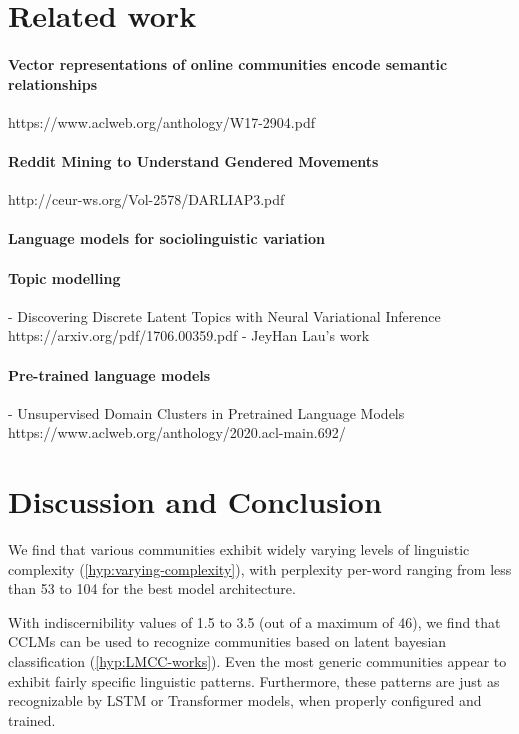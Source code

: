 \documentclass[11pt,a4paper]{article}
\begin{document}
\section{Related work}

\paragraph{Vector representations of online communities encode semantic relationships}
https://www.aclweb.org/anthology/W17-2904.pdf

\paragraph{Reddit Mining to Understand Gendered Movements}
http://ceur-ws.org/Vol-2578/DARLIAP3.pdf

\paragraph{Language models for sociolinguistic variation}
\cite{DelTredici2017}

\paragraph{Topic modelling}
- Discovering Discrete Latent Topics with Neural Variational Inference https://arxiv.org/pdf/1706.00359.pdf
- JeyHan Lau's work

\paragraph{Pre-trained language models}
- Unsupervised Domain Clusters in Pretrained Language Models https://www.aclweb.org/anthology/2020.acl-main.692/


\section{Discussion and Conclusion}


We find that various communities exhibit widely varying levels of
linguistic complexity (\cref{hyp:varying-complexity}), with perplexity
per-word ranging from less than 53 to 104 for the best model
architecture.

With indiscernibility values of 1.5 to 3.5 (out of a maximum of 46),
we find that CCLMs can be used to recognize communities based on
latent bayesian classification (\cref{hyp:LMCC-works}). Even the most
generic communities appear to exhibit fairly specific linguistic
patterns. Furthermore, these patterns are just as recognizable by LSTM
or Transformer models, when properly configured and trained.
\end{document}
